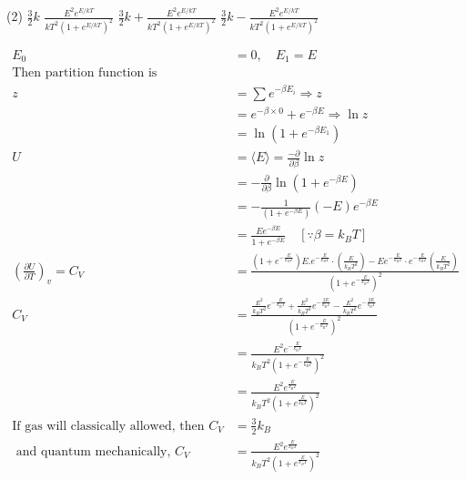 \begin{enumerate}
	{}
	\begin{tasks}(2)
		\task[\textbf{A.}] $\frac{3}{2} k$
		\task[\textbf{B.}] $\frac{E^{2} e^{E / k T}}{k T^{2}\left(1+e^{E / k T}\right)^{2}}$
		\task[\textbf{C.}] $\frac{3}{2} k+\frac{E^{2} e^{E / k T}}{k T^{2}\left(1+e^{E / k T}\right)^{2}}$
		\task[\textbf{D.}] $\frac{3}{2} k-\frac{E^{2} e^{E / k T}}{k T^{2}\left(1+e^{E / k T}\right)^{2}}$
	\end{tasks}
	\begin{answer}
		\begin{align*}
		E_{0}&=0, \quad E_{1}=E\\
		\text{Then partition function is}\\
		z&=\sum e^{-\beta E_{i}} \Rightarrow z\\&=e^{-\beta \times 0}+e^{-\beta E} \Rightarrow \ln z\\&=\ln \left(1+e^{-\beta E_{1}}\right)\\
		U&=\langle E\rangle=\frac{-\partial}{\partial \beta} \ln z\\&=-\frac{\partial}{\partial \beta} \ln \left(1+e^{-\beta E}\right)\\&=-\frac{1}{\left(1+e^{-\beta E}\right)}(-E) e^{-\beta E}\\&=\frac{E e^{-\beta E}}{1+e^{-\beta E}} \quad\left[\because \beta=k_{B} T\right]\\
		\left(\frac{\partial U}{\partial T}\right)_{v}=C_{V}&=\frac{\left(1+e^{-\frac{E}{k_{B} T}}\right) E . e^{-\frac{E}{k_{B} T}} \cdot\left(\frac{E}{k_{B} T^{2}}\right)-E e^{-\frac{E}{k_{B} T}} \cdot e^{-\frac{E}{k_{B} T}}\left(\frac{E}{k_{B} T^{2}}\right)}{\left(1+e^{-\frac{E}{k_{B} T}}\right)^{2}}\\
		C_{V}&=\frac{\frac{E^{2}}{k_{B} T^{2}} e^{-\frac{E}{k_{\mathrm{B}} T}}+\frac{E^{2}}{k_{B} T^{2}} e^{-\frac{2 E}{k_{\mathrm{B}} T}}-\frac{E^{2}}{k_{B} T^{2}} e^{-\frac{2 E}{k_{\mathrm{B}} T}}}{\left(1+e^{-\frac{E}{k_{\mathrm{B}} T}}\right)^{2}}\\&=\frac{E^{2} e^{-\frac{E}{k_{\mathrm{B}} T}}}{k_{B} T^{2}\left(1+e^{-\frac{E}{k_{\mathrm{B}} T}}\right)^{2}}\\&=\frac{E^{2} e^{\frac{E}{k_{\mathrm{B}} T}}}{k_{B} T^{2}\left(1+e^{\frac{E}{k_{\mathrm{B}} T}}\right)^{2}}\\
		\text{If gas will classically allowed, then }C_{V}&=\frac{3}{2} k_{B}\\
		\text{	and quantum mechanically, }C_{V}&=\frac{E^{2} e^{\frac{E}{k_{B} T}}}{k_{B} T^{2}\left(1+e^{\frac{E}{k_{B} T}}\right)^{2}}\\

\end{align*}
\end{answer}
\end{enumerate}
